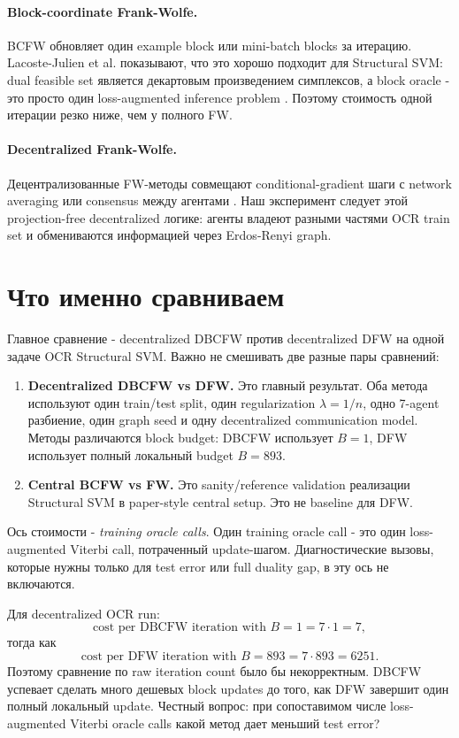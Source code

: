 \documentclass[11pt,a4paper]{article}
\begin{document}
\paragraph{Block-coordinate Frank-Wolfe.}
BCFW обновляет один example block или mini-batch blocks за итерацию. Lacoste-Julien et al. показывают, что это хорошо подходит для Structural SVM: dual feasible set является декартовым произведением симплексов, а block oracle - это просто один loss-augmented inference problem \citep{lacostejulien2013bcfw}. Поэтому стоимость одной итерации резко ниже, чем у полного FW.

\paragraph{Decentralized Frank-Wolfe.}
Децентрализованные FW-методы совмещают conditional-gradient шаги с network averaging или consensus между агентами \citep{wai2017decentralized}. Наш эксперимент следует этой projection-free decentralized логике: агенты владеют разными частями OCR train set и обмениваются информацией через Erdos-Renyi graph.

\section{Что именно сравниваем}

Главное сравнение - decentralized DBCFW против decentralized DFW на одной задаче OCR Structural SVM. Важно не смешивать две разные пары сравнений:

\begin{enumerate}
  \item \textbf{Decentralized DBCFW vs DFW.} Это главный результат. Оба метода используют один train/test split, один regularization \(\lambda=1/n\), одно 7-agent разбиение, один graph seed и одну decentralized communication model. Методы различаются block budget: DBCFW использует \(B=1\), DFW использует полный локальный budget \(B=893\).
  \item \textbf{Central BCFW vs FW.} Это sanity/reference validation реализации Structural SVM в paper-style central setup. Это не baseline для DFW.
\end{enumerate}

Ось стоимости - \emph{training oracle calls}. Один training oracle call - это один loss-augmented Viterbi call, потраченный update-шагом. Диагностические вызовы, которые нужны только для test error или full duality gap, в эту ось не включаются.

Для decentralized OCR run:
\[
  \text{cost per DBCFW iteration with }B=1 = 7\cdot 1 = 7,
\]
тогда как
\[
  \text{cost per DFW iteration with }B=893 = 7\cdot 893 = 6251.
\]
Поэтому сравнение по raw iteration count было бы некорректным. DBCFW успевает сделать много дешевых block updates до того, как DFW завершит один полный локальный update. Честный вопрос: при сопоставимом числе loss-augmented Viterbi oracle calls какой метод дает меньший test error?
\end{document}

